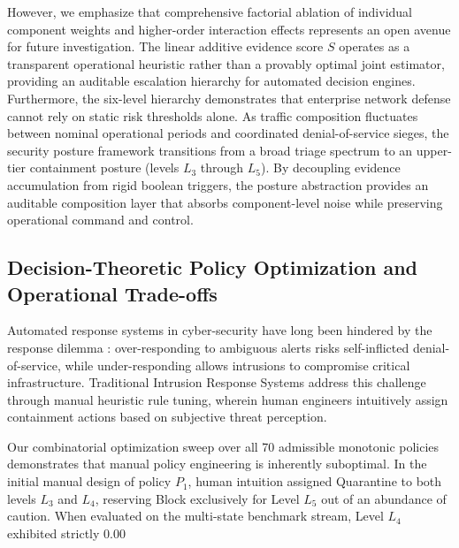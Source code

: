 \documentclass[journal,10pt,onecolumn]{IEEEtran}
\begin{document}
However, we emphasize that comprehensive factorial ablation of individual component weights and higher-order interaction effects represents an open avenue for future investigation. The linear additive evidence score $S$ operates as a transparent operational heuristic rather than a provably optimal joint estimator, providing an auditable escalation hierarchy for automated decision engines. Furthermore, the six-level hierarchy demonstrates that enterprise network defense cannot rely on static risk thresholds alone. As traffic composition fluctuates between nominal operational periods and coordinated denial-of-service sieges, the security posture framework transitions from a broad triage spectrum to an upper-tier containment posture (levels $L_3$ through $L_5$). By decoupling evidence accumulation from rigid boolean triggers, the posture abstraction provides an auditable composition layer that absorbs component-level noise while preserving operational command and control.


\subsection{Decision-Theoretic Policy Optimization and Operational Trade-offs}
Automated response systems in cyber-security have long been hindered by the response dilemma \cite{26, 27}: over-responding to ambiguous alerts risks self-inflicted denial-of-service, while under-responding allows intrusions to compromise critical infrastructure. Traditional Intrusion Response Systems address this challenge through manual heuristic rule tuning, wherein human engineers intuitively assign containment actions based on subjective threat perception.

Our combinatorial optimization sweep over all 70 admissible monotonic policies demonstrates that manual policy engineering is inherently suboptimal. In the initial manual design of policy $P_1$, human intuition assigned Quarantine to both levels $L_3$ and $L_4$, reserving Block exclusively for Level $L_5$ out of an abundance of caution. When evaluated on the multi-state benchmark stream, Level $L_4$ exhibited strictly 0.00%
\end{document}
